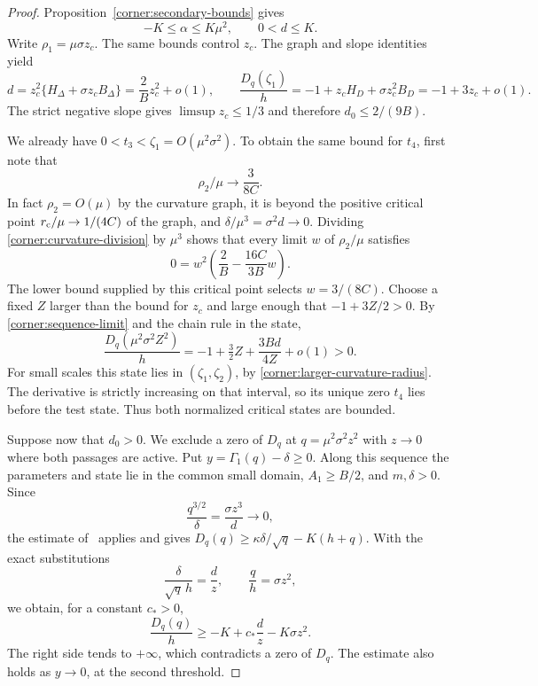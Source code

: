 \begin{proof}
Proposition~\ref{corner:secondary-bounds} gives
\[
 -K\leq\alpha\leq K\mu^2,\qquad 0<d\leq K.
\]
Write $\rho_1=\mu\sigma z_c$.  The same bounds control $z_c$.
The graph and slope identities yield
\begin{equation}\label{corner:normalized-curvature}
 d=z_c^2\{H_\Delta+\sigma z_cB_\Delta\}
       =\frac2Bz_c^2+o(1),\qquad
 \frac{D_q(\zeta_1)}h=-1+z_cH_D+\sigma z_c^2B_D
       =-1+3z_c+o(1).
\end{equation}
The strict negative slope gives $\limsup z_c\leq1/3$ and therefore
$d_0\leq2/(9B)$.

We already have $0<t_3<\zeta_1=O(\mu^2\sigma^2)$.
To obtain the same bound for $t_4$, first note that
\begin{equation}\label{corner:larger-curvature-radius}
 \rho_2/\mu\longrightarrow\frac3{8C}.
\end{equation}
In fact $\rho_2=O(\mu)$ by the curvature graph, it is beyond the
positive critical point $r_{\rm c}/\mu\to1/(4C)$ of the graph, and
$\delta/\mu^3=\sigma^2d\to0$.  Dividing
\eqref{corner:curvature-division} by $\mu^3$ shows that every limit
$w$ of $\rho_2/\mu$ satisfies
\[
 0=w^2\left(\frac2B-\frac{16C}{3B}w\right).
\]
The lower bound supplied by this critical point selects $w=3/(8C)$.
Choose a fixed $Z$ larger than the bound for $z_c$ and large enough
that $-1+3Z/2>0$.  By \eqref{corner:sequence-limit} and the chain rule in the state,
\[
 \frac{D_q(\mu^2\sigma^2Z^2)}h
 =-1+\tfrac32Z+\frac{3Bd}{4Z}+o(1)>0.
\]
For small scales this state lies in $(\zeta_1,\zeta_2)$, by
\eqref{corner:larger-curvature-radius}.  The derivative is strictly
increasing on that interval, so its unique zero $t_4$ lies before
the test state.  Thus both normalized critical states are bounded.

Suppose now that $d_0>0$. We exclude a zero of $D_q$ at
$q=\mu^2\sigma^2z^2$ with $z\to0$ where both passages are active.
Put $y=\Gamma_1(q)-\delta\geq0$. Along this sequence the parameters
and state lie in the common small domain, $A_1\ge B/2$, and $m,\delta>0$.
Since
\[
 \frac{q^{3/2}}{\delta}=\frac{\sigma z^3}{d}\longrightarrow0,
\]
the estimate of~\cite[(\ref*{main-sat:threshold-slope-exclusion})]{main2026} applies and gives
$D_q(q)\geq\kappa\delta/\sqrt q-K(h+q)$.
With the exact substitutions
\[
 \frac{\delta}{\sqrt q\,h}=\frac dz,\qquad
 \frac qh=\sigma z^2,
\]
we obtain, for a constant $c_*>0$,
\begin{equation}\label{corner:event-layer-slope-exclusion}
 \frac{D_q(q)}h\geq-K+c_*\frac dz-K\sigma z^2.
\end{equation}
The right side tends to $+\infty$, which contradicts a zero of $D_q$. The
estimate also holds as $y\to0$, at the second threshold.


\end{proof}
